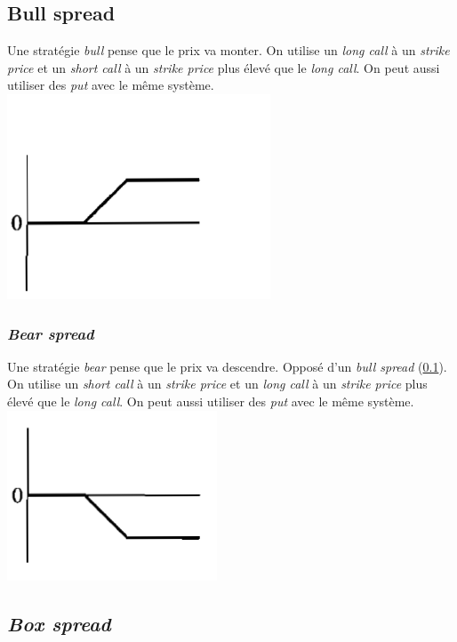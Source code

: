 \documentclass[11pt,french]{report}
\begin{document}
\subsection{Bull spread}
\label{sec:sec:bull spread}

Une stratégie \emph{bull} pense que le prix va monter. On utilise un \emph{long call} à un \emph{strike price} et un \emph{short call} à un \emph{strike price} plus élevé que le \emph{long call}. On peut aussi utiliser des \emph{put} avec le même système.
\\
\includegraphics[scale=0.45]{picture32.PNG}

\subsubsection{\emph{Bear spread}}
\label{sec:sec:bear spread}

Une stratégie \emph{bear} pense que le prix va descendre. Opposé d'un \emph{bull spread} (\ref{sec:sec:bull spread}). On utilise un \emph{short call} à un \emph{strike price} et un \emph{long call} à un \emph{strike price} plus élevé que le \emph{long call}. On peut aussi utiliser des \emph{put} avec le même système.
\\
\includegraphics[scale=0.45]{picture33.PNG}

\subsection{\emph{Box spread}}
\label{sec:sec:box spread}
\end{document}
